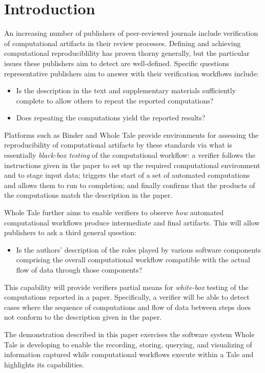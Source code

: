 \section{Introduction}

An increasing number of publishers of peer-reviewed journals include verification of computational artifacts in their review processes.  Defining and achieving computational reproduciblility has proven thorny generally, but the particular issues these publishers aim to detect are well-defined. Specific questions representative publishers aim to answer with their verification workflows include:

\begin{itemize}[label=\raisebox{0.25ex}{\tiny$\bullet$}]

\item Is the description in the text and supplementary materials sufficiently complete to allow others to repeat the reported computations?

\item Does repeating the computations yield the reported results?

\end{itemize}

Platforms such as Binder \cite{Binder_2018} and Whole Tale  \cite{brinckman2019computing} provide environments for assessing the reproducibility of computational artifacts by these standards via what is essentially \emph{black-box testing} of the computational workflow: a verifier follows the instructions given in the paper to set up the required computational environment and to stage input data; triggers the start of a set of automated computations and allows them to run to completion; and finally confirms that the products of the computations match the description in the paper.

Whole Tale further aims to enable verifiers to observe \emph{how} automated computational workflows produce intermediate and final artifacts. This will allow publishers to ask a third general question:

\begin{itemize}[label=\raisebox{0.25ex}{\tiny$\bullet$}]

\item Is the authors' description of the roles played by various software components comprising the overall computational workflow compatible with the actual flow of data through those components?

\end{itemize}

This capability will provide verifiers partial means for \emph{white-box} testing of the computations reported in a paper. Specifically, a verifier will be able to detect cases where the sequence of computations and flow of data between steps does not conform to the description given in the paper.  

The demonstration described in this paper exercises the software system Whole Tale is developing to enable the recording, storing, querying, and visualizing of information captured while computational workflows execute within a Tale and highlights its capabilities.






